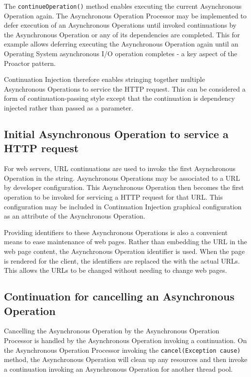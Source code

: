 \documentclass{article}
\begin{document}
The \texttt{continueOperation()} method enables executing the current
Asynchronous Operation again.  The Asynchronous Operation Processor may be
implemented to defer execution of an Asynchronous Operations until invoked
continuations by the Asynchronous Operation or any of its dependencies are
completed.  This for example allows deferring executing the Asynchronous
Operation again until an Operating System asynchronous I/O operation completes -
a key aspect of the Proactor pattern.

Continuation Injection therefore enables stringing together multiple
Asynchronous Operations to service the HTTP request.  This can be considered a
form of continuation-passing style except that the continuation is dependency
injected rather than passed as a parameter.


\subsection{Initial Asynchronous Operation to service a HTTP request}

For web servers, URL continuations \cite{url-continuation} are used to invoke
the first Asynchronous Operation in the string.  Asynchronous Operations may be
associated to a URL by developer configuration.  This Asynchronous Operation
then becomes the first operation to be invoked for servicing a HTTP request for
that URL.  This configuration may be included in Continuation Injection graphical
configuration as an attribute of the Asynchronous Operation.

Providing identifiers to these Asynchronous Operations is also a convenient
means to ease maintenance of web pages.  Rather than embedding the URL in the
web page content, the Asynchronous Operation identifier is used.  When the page
is rendered for the client, the identifiers are replaced the with the actual
URLs.  This allows the URLs to be changed without needing to change web pages.


\subsection{Continuation for cancelling an Asynchronous Operation}

Cancelling the Asynchronous Operation by the Asynchronous Operation Processor is
handled by the Asynchronous Operation invoking a continuation.  On the
Asynchronous Operation Processor invoking the \texttt{cancel(Exception cause)}
method, the Asynchronous Operation will clean up any resources and then invoke a
continuation invoking an Asynchronous Operation for another thread pool.
\end{document}

